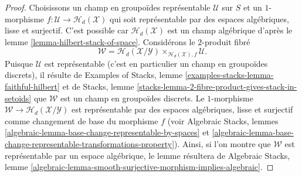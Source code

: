 \begin{proof}
Choisissons un champ en groupoïdes représentable $\mathcal{U}$ sur $S$ et un
$1$-morphisme $f : \mathcal{U} \to \mathcal{H}_d(\mathcal{X})$
qui soit représentable par des espaces algébriques, lisse et surjectif.
C'est possible car $\mathcal{H}_d(\mathcal{X})$ est un champ algébrique d'après le
lemme \ref{lemma-hilbert-stack-of-space}.
Considérons le $2$-produit fibré
$$
\mathcal{W} =
\mathcal{H}_d(\mathcal{X}/\mathcal{Y})
\times_{\mathcal{H}_d(\mathcal{X}), f}
\mathcal{U}.
$$
Puisque $\mathcal{U}$ est représentable (c'est en particulier un champ en
groupoïdes discrets), il résulte de
Examples of Stacks, lemme \ref{examples-stacks-lemma-faithful-hilbert}
et de
Stacks, lemme \ref{stacks-lemma-2-fibre-product-gives-stack-in-setoids}
que $\mathcal{W}$ est un champ en groupoïdes discrets. Le $1$-morphisme
$\mathcal{W} \to \mathcal{H}_d(\mathcal{X}/\mathcal{Y})$ est
représentable par des espaces algébriques, lisse et surjectif comme changement
de base du morphisme $f$ (voir
Algebraic Stacks,
lemmes \ref{algebraic-lemma-base-change-representable-by-spaces} et
\ref{algebraic-lemma-base-change-representable-transformations-property}).
Ainsi, si l'on montre que $\mathcal{W}$ est représentable par un espace algébrique,
le lemme résultera de
Algebraic Stacks,
lemme \ref{algebraic-lemma-smooth-surjective-morphism-implies-algebraic}.


\end{proof}
